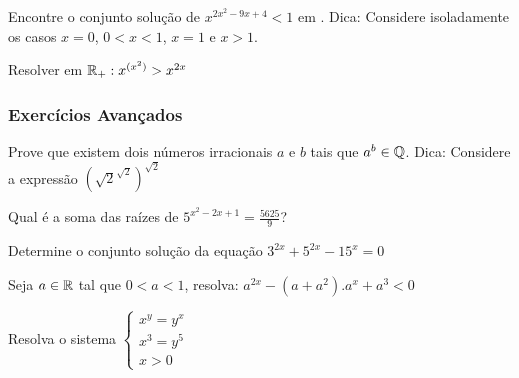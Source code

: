 \begin{exer}
Encontre o conjunto solução de $x^{2x^2-9x+4}<1$ em \Rep. Dica: Considere isoladamente os casos $x=0$, $0<x<1$, $x=1$ e $x>1$.
\end{exer}
\begin{exer}
Resolver em $\mathbb{R}_+: x^{(x^2)}>x^{2x}$
\end{exer}
\subsubsection{Exercícios Avançados}
\begin{exer} Prove que existem dois números irracionais $a$ e $b$ tais que $a^b \in \mathbb{Q}$. Dica: Considere a expressão $(\sqrt{2}^{\sqrt{2}})^{\sqrt{2}}$
\end{exer}

\begin{exer} Qual é a soma das raízes de $5^{x^2-2x+1}=\frac{5625}{9}$?
\end{exer}

\begin{exer}[ITA] Determine o conjunto solução da equação $3^{2x} + 5^{2x} - 15^x=0$
\end{exer}

\begin{exer} Seja $a \in \mathbb{R}$ tal que $0<a<1$, resolva: $a^{2x}-(a+a^2).a^x+a^3<0$
\end{exer}
\begin{exer}[IME] Resolva o sistema
$ \left\{
\begin{array}{ll}
\displaystyle x^y=y^x \\
\displaystyle x^3=y^5\\
\displaystyle x>0
\end{array}
\right.
$
\end{exer}
\terminaexer